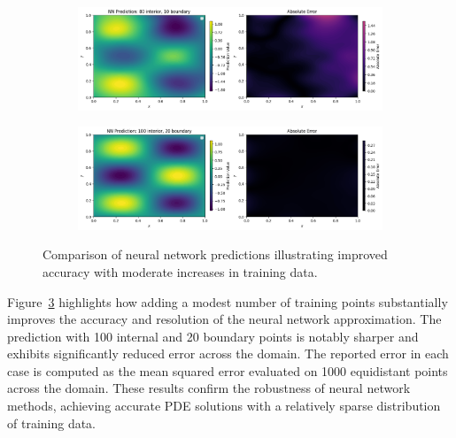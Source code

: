 \begin{figure}[h]
    \centering
    \begin{subfigure}[t]{0.8\textwidth}
        \centering
        \includegraphics[width=\textwidth]{graphics/pde_points_80_10.png}
        \label{fig:prediction_80}
    \end{subfigure}
    
    \vspace{1em} 
    
    \begin{subfigure}[t]{0.8\textwidth}
        \centering
        \includegraphics[width=\textwidth]{graphics/pde_points_100_20.png}
        \label{fig:prediction_100}
    \end{subfigure}
    \caption{Comparison of neural network predictions illustrating improved accuracy with moderate increases in training data.}
    \label{fig:stacked_predictions}
\end{figure}

Figure~\ref{fig:stacked_predictions} highlights how adding a modest number of training points 
substantially improves the accuracy and resolution of the neural network approximation. The 
prediction with 100 internal and 20 boundary points is notably sharper and exhibits significantly 
reduced error across the domain. The reported error in each case is computed as the mean squared 
error evaluated on 1000 equidistant points across the domain. These results confirm the robustness 
of neural network methods, achieving accurate PDE solutions with a relatively sparse distribution 
of training data.